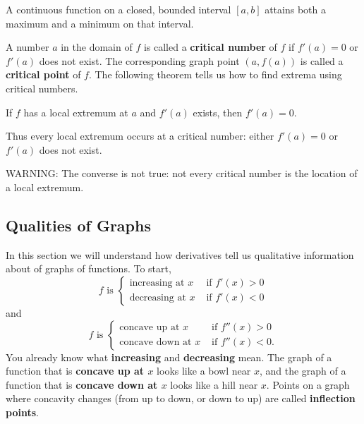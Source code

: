 \begin{thm}
A continuous function on a closed, bounded interval $[a,b]$ attains both
a maximum and a minimum on that interval.
\end{thm}


A number $a$ in the domain of $f$ is called a \textbf{critical number} of $f$ if $f'(a)=0$ or $f'(a)$ does not exist. The corresponding graph point $(a,f(a))$ is called a \textbf{critical point} of $f$. The following theorem tells us how to find extrema using critical numbers.

\begin{thm}
If $f$ has a local extremum at $a$ and $f'(a)$ exists, then $f'(a)=0$.
\end{thm}

Thus every local extremum occurs at a critical number: either $f'(a)=0$
or $f'(a)$ does not exist.

\noindent WARNING: The converse is not true: not every critical number is the location of a local extremum.

\subsection{Qualities of Graphs}

In this section we will understand how derivatives tell us qualitative information about of graphs of functions. To start,
$$f \text{ is }
\begin{cases}\text{increasing at }x &\text{ if } f'(x)>0 \\ \text{decreasing at }x &\text{ if } f'(x)<0\end{cases}
$$
and
$$
f \text{ is }\begin{cases}\text{concave up at }x &\text{ if } f''(x)>0 \\ \text{concave down at }x &\text{ if } f''(x)<0.\end{cases}
$$
You already know what \textbf{increasing} and \textbf{decreasing} mean. The graph of a function that is \textbf{concave up at $x$} looks like a bowl near $x$, and the graph of a function that is \textbf{concave down at $x$} looks like a hill near $x$. Points on a graph where concavity changes (from up to down, or down to up) are called \textbf{inflection points}. 

